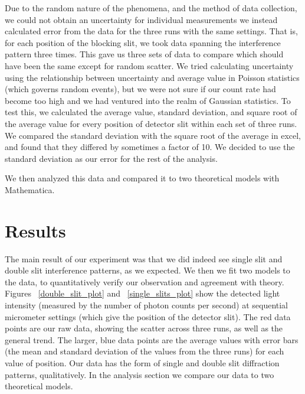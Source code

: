 \documentclass[prb,preprint]{revtex4-1}
\begin{document}
Due to the random nature of the phenomena, and the method of data collection, we could not obtain an uncertainty for individual measurements we instead calculated error from the data for the three runs with the same settings. That is, for each position of the blocking slit, we took data spanning the interference pattern three times.  This gave us three sets of data to compare which should have been the same except for random scatter.  We tried calculating uncertainty using the relationship between uncertainty and average value in Poisson statistics (which governs random events), but we were not sure if our count rate had become too high and we had ventured into the realm of Gaussian statistics.  To test this, we calculated the average value, standard deviation, and square root of the average value for every position of detector slit within each set of three runs.  We compared the standard deviation with the square root of the average in excel, and found that they differed by sometimes a factor of 10.  We decided to use the standard deviation as our error for the rest of the analysis.  

We then analyzed this data and compared it to two theoretical models with Mathematica.  

\section{Results}

The main result of our experiment was that we did indeed see single slit and double slit interference patterns, as we expected.  We then we fit two models to the data, to quantitatively verify our observation and agreement with theory.  Figures ~\ref{double_slit_plot} and ~\ref{single_slits_plot} show the detected light intensity (measured by the number of photon counts per second) at sequential micrometer settings (which give the position of the detector slit). The red data points are our raw data, showing the scatter across three runs, as well as the general trend. The larger, blue data points are the average values with error bars (the mean and standard deviation of the values from the three runs) for each value of position.  Our data has the form of single and double slit diffraction patterns, qualitatively.  In the analysis section we compare our data to two theoretical models. 
\end{document}
